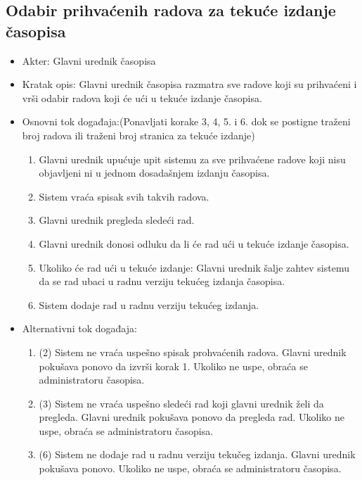 \documentclass[a4paper]{article}
\begin{document}
\subsection{Odabir prihvaćenih radova za tekuće izdanje časopisa}
\begin{itemize}
    \item Akter: Glavni urednik časopisa
    \item Kratak opis: Glavni urednik časopisa razmatra sve radove koji su prihvaćeni i vrši odabir radova koji će ući u tekuće izdanje časopisa.
    \item Osnovni tok događaja:(Ponavljati korake 3, 4, 5. i 6. dok se postigne traženi broj radova ili traženi broj stranica za tekuće izdanje)
        \begin{enumerate}
            \item Glavni urednik upućuje upit sistemu za sve prihvaćene radove koji nisu objavljeni ni u jednom dosadašnjem izdanju časopisa.
            \item Sistem vraća spisak svih takvih radova.
            \item Glavni urednik pregleda sledeći rad.
            \item Glavni urednik donosi odluku da li će rad ući u tekuće izdanje časopisa.
            \item Ukoliko će rad ući u tekuće izdanje: Glavni urednik šalje zahtev sistemu da se rad ubaci u radnu verziju tekućeg izdanja časopisa.
            \item Sistem dodaje rad u radnu verziju tekućeg izdanja.
        \end{enumerate}
    \item Alternativni tok događaja:
        \begin{enumerate}
            \item  (2) Sistem ne vraća uspešno spisak prohvaćenih radova. Glavni urednik pokušava ponovo da izvrši korak 1. Ukoliko ne uspe, obraća se administratoru časopisa.
            \item (3) Sistem ne vraća uspešno sledeći rad koji glavni urednik želi da pregleda. Glavni urednik pokušava ponovo da pregleda rad. Ukoliko ne uspe, obraća se administratoru časopisa.
            \item (6) Sistem ne dodaje rad u radnu verziju tekučeg izdanja. Glavni urednik pokušava ponovo. Ukoliko ne uspe, obraća se administratoru časopisa.
        \end{enumerate}
\end{itemize}
\end{document}
